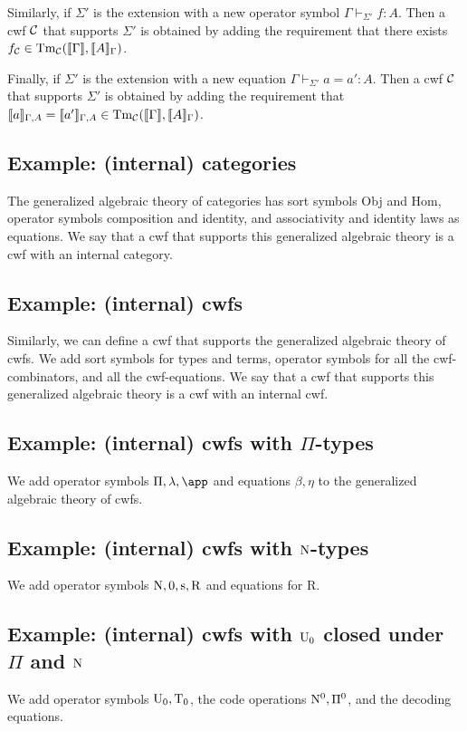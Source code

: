 \documentclass{lmcs}
\newcommand{\s}{\mathrm{s}}
\newcommand{\Rec}{\mathrm{R}}
\newcommand{\Ta}{\mathrm{T}}
\begin{document}
Similarly, if $\Sigma'$ is the extension with a new operator symbol $\Gamma \vdash_{\Sigma'} f : A$. Then a cwf ${\mathcal C}$ that supports $\Sigma'$ is obtained by adding the requirement that there exists $f_{\mathcal C} \in\mathrm{Tm}_{\mathcal C}(\llbracket \Gamma \rrbracket,\llbracket A \rrbracket_{\Gamma})$.

Finally, if $\Sigma'$ is the extension with a new equation $\Gamma \vdash_{\Sigma'} a = a': A$. Then a cwf ${\mathcal C}$ that supports $\Sigma'$ is obtained by adding the requirement that $\llbracket a \rrbracket_{\Gamma,A}= \llbracket a' \rrbracket_{\Gamma,A} \in \mathrm{Tm}_{\mathcal C}(\llbracket \Gamma \rrbracket,\llbracket A \rrbracket_\Gamma)$.

\subsection{Example: (internal) categories} The generalized algebraic theory of categories has sort symbols Obj and Hom, operator symbols composition and identity, and associativity and identity laws as equations. We say that a cwf that supports this generalized algebraic theory is a cwf with an internal category.

\subsection{Example: (internal) cwfs} Similarly, we can define a cwf that supports the generalized algebraic theory of cwfs. We add sort symbols for types and terms, operator symbols for all the cwf-combinators, and all the cwf-equations. We say that a cwf that supports this generalized algebraic theory is a cwf with an internal cwf.

\subsection{Example: (internal) cwfs with $\Pi$-types} 
We add operator symbols $\Pi, \lambda, \app$ and equations $\beta, \eta$ to the generalized algebraic theory of cwfs. 

\subsection{Example: (internal) cwfs with $\mathrm{N}$-types} 
We add operator symbols $\N, 0, \s, \Rec$ and equations for $\Rec$.

\subsection{Example: (internal) cwfs with $\mathrm{U}_0$ closed under $\Pi$ and $\mathrm{N}$} 
We add operator symbols $\U_0, \Ta_0$, the code operations $\mathrm{N}^0, \Pi^0$, and the decoding equations.
\end{document}
